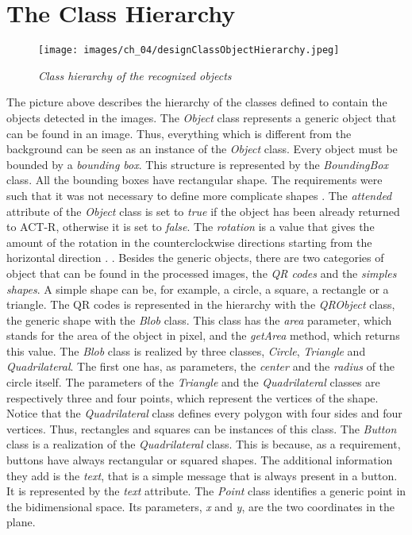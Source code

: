   \section{The Class Hierarchy}
  \begin{figure}[h]
	  \begin{center} 
	    \texttt{[image: images/ch\_04/designClassObjectHierarchy.jpeg]}
	  \end{center} 
	  \caption{\textit{Class hierarchy of the recognized objects}}  
	  \label{fig:callHierarchy}
  \end{figure}
   {\newpage}
   {\newpage}
   {\newpage}
   {\newpage}
  The picture above describes the hierarchy of the classes defined to contain the objects detected in the images. The \textit{Object} class represents a generic object that can be found in an image. Thus, everything which is different from the background can be seen as an instance of the \textit{Object} class. Every object must be bounded by a \textit{bounding box}. This structure is represented by the \textit{BoundingBox} class. All the bounding boxes have rectangular shape. The requirements were such that it was not necessary to define more complicate shapes . The \textit{attended} attribute of the \textit{Object}  class is set to \textit{true} if the object has been already returned to ACT-R, otherwise it is set to \textit{false}. The \textit{rotation} is a value that gives the amount of the rotation in the counterclockwise directions starting from the horizontal direction . .
  Besides the generic objects, there are two categories of object that can be found in the processed images, the \textit{QR codes} and the \textit{simples shapes}. A simple shape can be, for example, a circle, a square, a rectangle or a triangle. The QR codes is represented in the hierarchy with the \textit{QRObject} class, the generic shape with the \textit{Blob} class.
  This class has the \textit{area} parameter, which stands for the area of the object in pixel, and the  \textit{getArea} method, which returns this value. The \textit{Blob} class is realized by three classes, \textit{Circle}, \textit{Triangle} and \textit{Quadrilateral}. 
  The first one has, as parameters, the \textit{center} and the \textit{radius} of the circle itself.
  The parameters of the \textit{Triangle} and the \textit{Quadrilateral} classes are respectively three and four points, which represent the vertices of the shape. Notice that the \textit{Quadrilateral} class defines every polygon with four sides and four vertices. Thus, rectangles and squares can be instances of this class. 
  The \textit{Button} class is a realization of the \textit{Quadrilateral} class. This is because, as a requirement, buttons have always rectangular or squared shapes. The additional information they add is the \textit{text}, that is a simple message that is always present in a button. It is represented by the \textit{text} attribute. 
  The \textit{Point} class identifies a generic point in the bidimensional space. Its parameters, \textit{x} and \textit{y}, are the two coordinates in the plane.
 

  
  
  
  
  